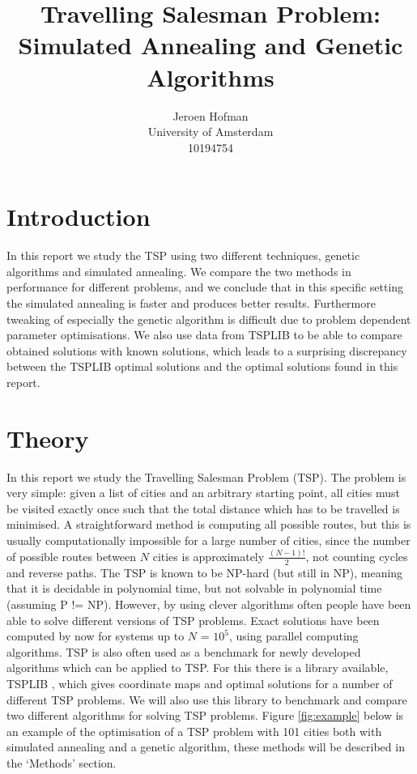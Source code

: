 \documentclass[10pt,a4paper]{article}
\begin{document}
\captionsetup{width=0.8\textwidth}

\author{Jeroen Hofman\\
  University of Amsterdam \\
  		10194754\\
		}
\title{Travelling Salesman Problem:\\
  Simulated Annealing and Genetic Algorithms
		}
\maketitle

\newpage

\section{Introduction}
In this report we study the TSP using two different techniques, genetic algorithms and simulated annealing. We compare the two methods in performance for different problems, and we conclude that in this specific setting the simulated annealing is faster and produces better results. Furthermore tweaking of especially the genetic algorithm is difficult due to problem dependent parameter optimisations. We also use data from TSPLIB to be able to compare obtained solutions with known solutions, which leads to a surprising discrepancy between the TSPLIB optimal solutions and the optimal solutions found in this report.

\section{Theory}
In this report we study the Travelling Salesman Problem (TSP). The problem is very simple: given a list of cities and an arbitrary starting point, all cities must be visited exactly once such that the total distance which has to be travelled is minimised. A straightforward method is computing all possible routes, but this is usually computationally impossible for a large number of cities, since the number of possible routes between $N$ cities is approximately $\frac{(N-1)!}{2}$, not counting cycles and reverse paths. The TSP is known to be NP-hard (but still in NP), meaning that it is decidable in polynomial time, but not solvable in polynomial time (assuming P != NP). However, by using clever algorithms often people have been able to solve different versions of TSP problems. Exact solutions have been computed by now for systems up to $N$ = $10^5$, using parallel computing algorithms. TSP is also often used as a benchmark for newly developed algorithms which can be applied to TSP. For this there is a library available, TSPLIB \cite{TSPLIB}, which gives coordinate maps and optimal solutions for a number of different TSP problems. We will also use this library to benchmark and compare two different algorithms for solving TSP problems. Figure \ref{fig:example} below is an example of the optimisation of a TSP problem with 101 cities both with simulated annealing and a genetic algorithm, these methods will be described in the `Methods' section.
\end{document}
